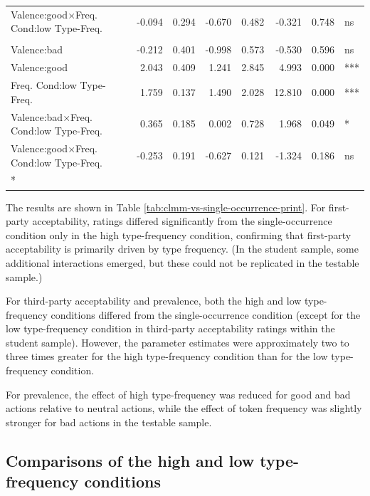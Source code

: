 \documentclass[
]{article}
\begin{document}
\begin{longtable}[t]{lrrrrrrl}
Valence:good$\times$Freq.
Cond:low
\hspace{1em}Type-Freq. & -0.094 & 0.294 & -0.670 & 0.482 & -0.321 & 0.748 & ns\\
\addlinespace[0.3em]
\multicolumn{8}{l}{\textbf{Prevalence - Low Type-Frequency (vs. Single Occurrence) - Testable}}\\
\hspace{1em}Valence:bad & -0.212 & 0.401 & -0.998 & 0.573 & -0.530 & 0.596 & ns\\
\hspace{1em}Valence:good & 2.043 & 0.409 & 1.241 & 2.845 & 4.993 & 0.000 & ***\\
Freq.
Cond:low
\hspace{1em}Type-Freq. & 1.759 & 0.137 & 1.490 & 2.028 & 12.810 & 0.000 & ***\\
Valence:bad$\times$Freq.
Cond:low
\hspace{1em}Type-Freq. & 0.365 & 0.185 & 0.002 & 0.728 & 1.968 & 0.049 & *\\
Valence:good$\times$Freq.
Cond:low
\hspace{1em}Type-Freq. & -0.253 & 0.191 & -0.627 & 0.121 & -1.324 & 0.186 & ns\\*
\end{longtable}

The results are shown in Table \ref{tab:clmm-vs-single-occurrence-print}. For first-party acceptability, ratings differed significantly from the single-occurrence condition only in the high type-frequency condition, confirming that first-party acceptability is primarily driven by type frequency. (In the student sample, some additional interactions emerged, but these could not be replicated in the testable sample.)

For third-party acceptability and prevalence, both the high and low type-frequency conditions differed from the single-occurrence condition (except for the low type-frequency condition in third-party acceptability ratings within the student sample). However, the parameter estimates were approximately two to three times greater for the high type-frequency condition than for the low type-frequency condition.

For prevalence, the effect of high type-frequency was reduced for good and bad actions relative to neutral actions, while the effect of token frequency was slightly stronger for bad actions in the testable sample.

\subsection{Comparisons of the high and low type-frequency conditions}\label{comparisons-of-the-high-and-low-type-frequency-conditions}
\end{document}
